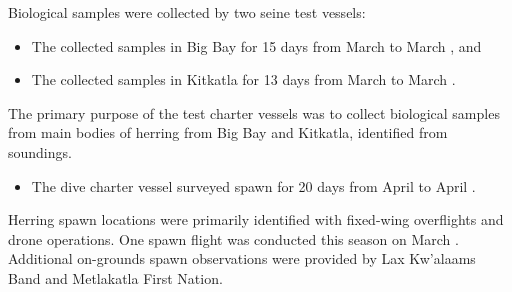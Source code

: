 Biological samples were collected by two seine test vessels:

\begin{itemize}

\item The  collected samples in Big Bay
for 15 days from March  to March , and

\item The  collected samples in Kitkatla
for 13 days from March  to March .

\end{itemize}

The primary purpose of the test charter vessels was to
collect biological samples from main bodies of herring
from Big Bay and Kitkatla, identified from soundings.

\begin{itemize}

\item The dive charter vessel  surveyed spawn
for 20 days from April  to April .

\end{itemize}

Herring spawn locations were primarily identified with
fixed-wing overflights and drone operations.
One spawn flight was conducted this season on March .
Additional on-grounds spawn observations were provided by
Lax Kw'alaams Band and Metlakatla First Nation.